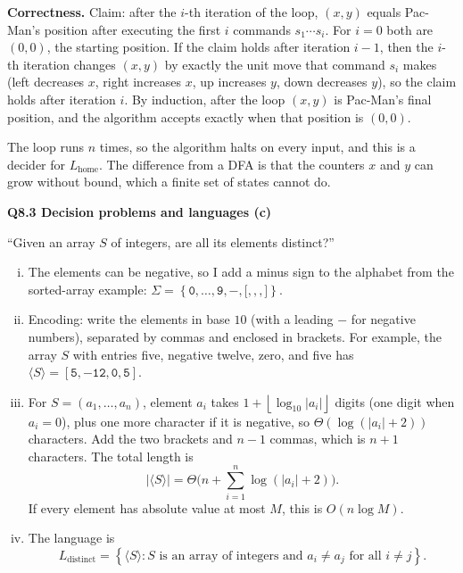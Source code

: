 \documentclass[11pt]{article}
\newcommand{\set}[1]{\left\{#1\right\}}
\newcommand{\abs}[1]{\left|#1\right|}
\newcommand{\floor}[1]{\left\lfloor #1 \right\rfloor}
\newcommand{\inner}[1]{\langle #1 \rangle}
\newcommand{\qpage}[1]{\clearpage\noindent\textbf{\large #1}\par\medskip}
\begin{document}
\textbf{Correctness.}
Claim: after the $i$-th iteration of the loop, $(x,y)$ equals Pac-Man's position after executing the first $i$ commands $s_1 \cdots s_i$.
For $i = 0$ both are $(0,0)$, the starting position.
If the claim holds after iteration $i-1$, then the $i$-th iteration changes $(x,y)$ by exactly the unit move that command $s_i$ makes (left decreases $x$, right increases $x$, up increases $y$, down decreases $y$), so the claim holds after iteration $i$.
By induction, after the loop $(x,y)$ is Pac-Man's final position, and the algorithm accepts exactly when that position is $(0,0)$.

The loop runs $n$ times, so the algorithm halts on every input, and this is a decider for $L_{\text{home}}$.
The difference from a DFA is that the counters $x$ and $y$ can grow without bound, which a finite set of states cannot do.

\qpage{Q8.3 Decision problems and languages (c)}

``Given an array $S$ of integers, are all its elements distinct?''

\begin{enumerate}[(i)]
  \item The elements can be negative, so I add a minus sign to the alphabet from the sorted-array example:
  $\Sigma = \set{\mathtt{0}, \ldots, \mathtt{9}, \mathtt{-}, \mathtt{[}, \mathtt{,}, \mathtt{]}}$.

  \item Encoding: write the elements in base $10$ (with a leading $\mathtt{-}$ for negative numbers), separated by commas and enclosed in brackets.
  For example, the array $S$ with entries five, negative twelve, zero, and five has $\inner{S} = \mathtt{[5,-12,0,5]}$.

  \item For $S = (a_1, \ldots, a_n)$, element $a_i$ takes $1 + \floor{\log_{10} \abs{a_i}}$ digits (one digit when $a_i = 0$), plus one more character if it is negative, so $\Theta(\log(\abs{a_i} + 2))$ characters.
  Add the two brackets and $n-1$ commas, which is $n+1$ characters.
  The total length is
  \[
    \abs{\inner{S}} = \Theta\Big(n + \sum_{i=1}^{n} \log(\abs{a_i} + 2)\Big).
  \]
  If every element has absolute value at most $M$, this is $O(n \log M)$.

  \item The language is
  \[
    L_{\text{distinct}} = \set{\inner{S} : S \text{ is an array of integers and } a_i \ne a_j \text{ for all } i \ne j}.
  \]
\end{enumerate}
\end{document}
